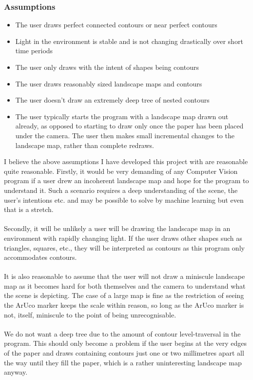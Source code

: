\documentclass[11pt]{article}
\begin{document}
\subsubsection{Assumptions}
\begin{itemize}
    \item The user draws perfect connected contours or near 
    	  perfect contours
    \item Light in the environment is stable and is not
    	  changing drastically over short time periods
    \item The user only draws with the intent of shapes being contours
    \item The user draws reasonably sized landscape maps and contours
    \item The user doesn't draw an extremely deep tree of nested contours
    \item The user typically starts the program with a landscape map drawn
    	  out already, as opposed to starting to draw only once the paper
    	  has been placed under the camera. The user then makes small 
    	  incremental changes to the landscape map, rather than complete 
    	  redraws.
\end{itemize}

I believe the above assumptions I have developed this project with
are reasonable quite reasonable.
Firstly, it would be very demanding of any Computer Vision program 
if a user drew an incoherent landscape map and hope for the program 
to understand it. Such a scenario requires a deep understanding of the scene,
the user's intentions etc. and may be possible to solve by machine learning
but even that is a stretch. \\
\\Secondly, it will be unlikely a user will be drawing the landscape map 
in an environment with rapidly changing light. If the user draws other 
shapes such as triangles, squares, etc., they will be interpreted as 
contours as this program only accommodates contours. \\
\\
It is also reasonable to assume that the user will not draw a 
miniscule landscape map as it becomes hard for both themselves and the camera
to understand what the scene is depicting.
The case of a large map is fine as the restriction of seeing the ArUco 
marker keeps the scale within reason, so long as the ArUco marker is not,
itself, miniscule to the point of being unrecognisable. \\
\\
We do not want a deep
tree due to the amount of contour level-traversal in the program. This
should only become a problem if the user begins at the very edges of the paper
and draws containing contours just one or two millimetres apart all the
way until they fill the paper, which is a rather uninteresting landscape map
anyway.
\end{document}
